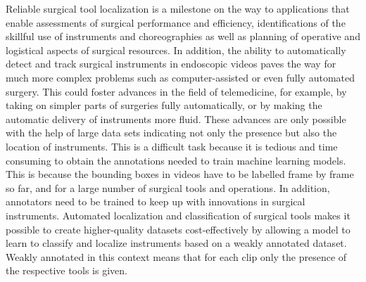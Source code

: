 Reliable surgical tool localization is a milestone on the way to applications that enable assessments of surgical performance and efficiency, identifications of the skillful use of instruments and choreographies as well as planning of operative and logistical aspects of surgical resources. In addition, the ability to automatically detect and track surgical instruments in endoscopic videos paves the way for much more complex problems such as computer-assisted or even fully automated surgery. This could foster advances in the field of telemedicine, for example, by taking on simpler parts of surgeries fully automatically, or by making the automatic delivery of instruments more fluid. These advances are only possible with the help of large data sets indicating not only the presence but also the location of instruments. This is a difficult task because it is tedious and time consuming to obtain the annotations needed to train machine learning models. This is because the bounding boxes in videos have to be labelled frame by frame so far, and for a large number of surgical tools and operations. In addition, annotators need to be trained to keep up with innovations in surgical instruments. Automated localization and classification of surgical tools makes it possible to create higher-quality datasets cost-effectively by allowing a model to learn to classify and localize instruments based on a weakly annotated dataset. Weakly annotated in this context means that for each clip only the presence of the respective tools is given.